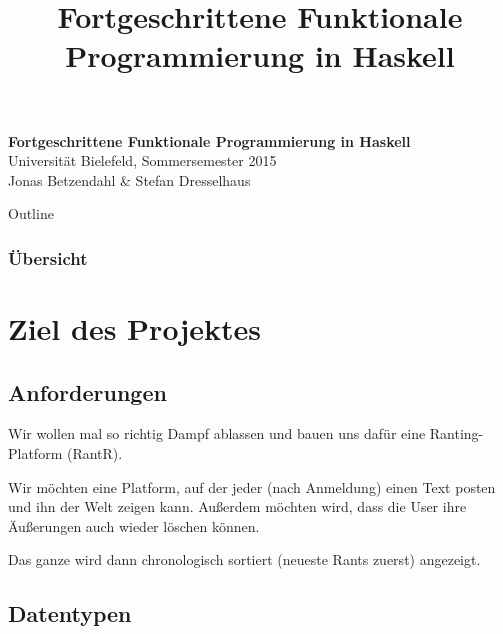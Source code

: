 \documentclass{beamer}
\title{Fortgeschrittene Funktionale Programmierung in Haskell}
\begin{document}
  

  \begin{frame}
  \begin{center}
    \huge\textbf{Fortgeschrittene Funktionale Programmierung in Haskell}\\ \bigskip
    \LARGE Universität Bielefeld, Sommersemester 2015\\ \bigskip
    \large Jonas Betzendahl \& Stefan Dresselhaus
    \end{center}
  \end{frame}

\begin{frame}[allowframebreaks]{Outline}
\frametitle{Übersicht}
\tableofcontents[hideallsubsections]
\end{frame}

\section{Ziel des Projektes}

\subsection{Anforderungen}

\begin{frame}[fragile]

Wir wollen mal so richtig Dampf ablassen und bauen uns dafür eine Ranting-Platform (RantR).\\\par
\pause
Wir möchten eine Platform, auf der jeder (nach Anmeldung) einen Text posten und ihn der Welt zeigen kann. Außerdem möchten wird, dass die User ihre Äußerungen auch wieder löschen können.\\\par
\pause
Das ganze wird dann chronologisch sortiert (neueste Rants zuerst) angezeigt.

\end{frame}

\subsection{Datentypen}
\end{document}
